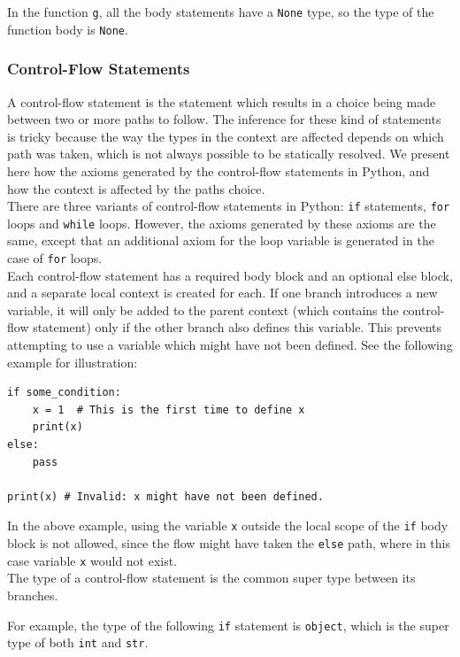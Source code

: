 In the function \lstinline|g|, all the body statements have a \lstinline|None| type, so the type of the function body is \lstinline|None|.

\subsubsection{Control-Flow Statements}
A control-flow statement is the statement which results in a choice being made between two or more paths to follow. The inference for these kind of statements is tricky because the way the types in the context are affected depends on which path was taken, which is not always possible to be statically resolved. We present here how the axioms generated by the control-flow statements in Python, and how the context is affected by the paths choice. \\

There are three variants of control-flow statements in Python: \lstinline|if| statements, \lstinline|for| loops and \lstinline|while| loops. However, the axioms generated by these axioms are the same, except that an additional axiom for the loop variable is generated in the case of \lstinline|for| loops. \\

Each control-flow statement has a required body block and an optional else block, and a separate local context is created for each. If one branch introduces a new variable, it will only be added to the parent context (which contains the control-flow statement) only if the other branch also defines this variable. This prevents attempting to use a variable which might have not been defined. See the following example for illustration:

\begin{lstlisting}
if some_condition:
	x = 1  # This is the first time to define x
	print(x)
else:
	pass
	
print(x) # Invalid: x might have not been defined.
\end{lstlisting}

In the above example, using the variable \lstinline|x| outside the local scope of the \lstinline|if| body block is not allowed, since the flow might have taken the \lstinline|else| path, where in this case variable \lstinline|x| would not exist. \\

The type of a control-flow statement is the common super type between its branches.

For example, the type of the following \lstinline|if| statement is \lstinline|object|, which is the super type of both \lstinline|int| and \lstinline|str|.

